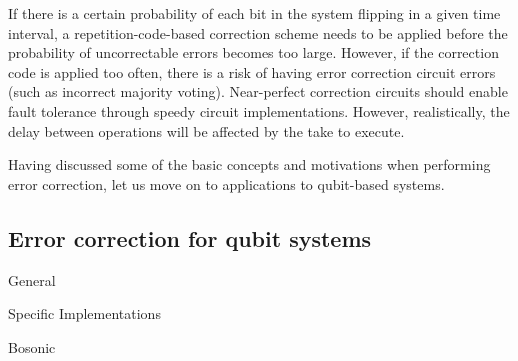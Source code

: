 If there is a certain probability of each bit in the system flipping in a given time interval, a repetition-code-based correction scheme needs to be applied before the probability of uncorrectable errors becomes too large. However, if the correction code is applied too often, there is a risk of having error correction circuit errors (such as incorrect majority voting). Near-perfect correction circuits should enable fault tolerance through speedy circuit implementations. However, realistically, the delay between operations will be affected by the take to execute.

Having discussed some of the basic concepts and motivations when performing error correction, let us move on to applications to qubit-based systems.


\subsection{Error correction for qubit systems}


\clearpage

General \cite{Girvin2021} \cite{Andersen2020} \cite{Gottesman2009} \cite{Roffe2019} \cite{devitt}

Specific Implementations \cite{Krinner2021} \cite{Chen2021} \cite{cleland2022}

Bosonic \cite{campagne2020} \cite{Lau2016} \cite{Chuang1997} \cite{Terhal2020} \cite{Blais2020} \cite{Hu2019} \cite{Michael2016} \cite{Grimsmo2021} \cite{Cai2021} \cite{Brady2023} \cite{lachance2023}